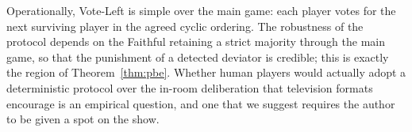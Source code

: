 \documentclass[11pt,a4paper]{article}
\begin{document}
Operationally, Vote-Left is simple over the main game: each player
votes for the next surviving player in the agreed cyclic ordering. The
robustness of the protocol depends on the Faithful retaining a strict
majority through the main game, so that the punishment of a detected
deviator is credible; this is exactly the region of
Theorem~\ref{thm:pbe}. Whether human players would actually adopt a
deterministic protocol over the in-room deliberation that television
formats encourage is an empirical question, and one that we suggest requires the
author to be given a spot on the show.



\end{document}

